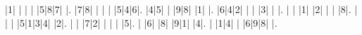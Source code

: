 \begin{sudoku-block}|1| | | | |5|8|7| |.
|7|8| | | | |5|4|6|.
|4|5| | |9|8| |1| |.
|6|4|2| | | |3| | |.
| | |1| |2| | | |8|.
| | | |5|1|3|4| |2|.
| | |7|2| | | | |5|.
| |6| |8| |9|1| |4|.
| |1|4| | |6|9|8| |.
\end{sudoku-block}
